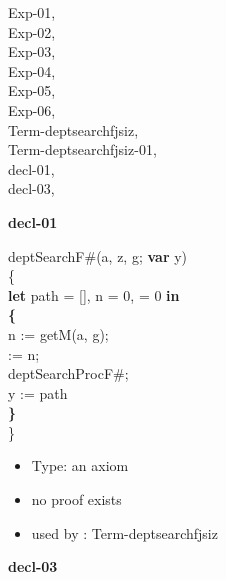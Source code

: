 \documentclass[a4paper]{article}
\begin{document}
\raggedright
              


{\parindent0cm

\begin{multicols}{3}
Exp-01, \pageref{lemma-Exp-01}\\
Exp-02, \pageref{lemma-Exp-02}\\
Exp-03, \pageref{lemma-Exp-03}\\
Exp-04, \pageref{lemma-Exp-04}\\
Exp-05, \pageref{lemma-Exp-05}\\
Exp-06, \pageref{lemma-Exp-06}\\
Term-deptsearchfjsiz, \pageref{lemma-Term-deptsearchfjsiz}\\
Term-deptsearchfjsiz-01, \pageref{lemma-Term-deptsearchfjsiz-01}\\
decl-01, \pageref{lemma-decl-01}\\
decl-03, \pageref{lemma-decl-03}\\

\end{multicols}}

{\LARGE\bf decl-01}\label{lemma-decl-01}

\medskip

deptSearchF\#(a, z, g; {\bf var} y) \\
\{\\
{\bf let} path = [], n = 0,  = 0 {\bf in}\\
{\bf \{}\\
\tabbe n := getM(a, g);\\
\tabbe {} := n;\\
\tabbe deptSearchProcF\#;\\
\tabbe y := path\\
{\bf \}}\\
\}

\begin{itemize}

\item Type: an axiom

\item       no proof exists
\item       used by      : Term-deptsearchfjsiz
\end{itemize}

\medskip

{\LARGE\bf decl-03}\label{lemma-decl-03}

\medskip
\end{document}
